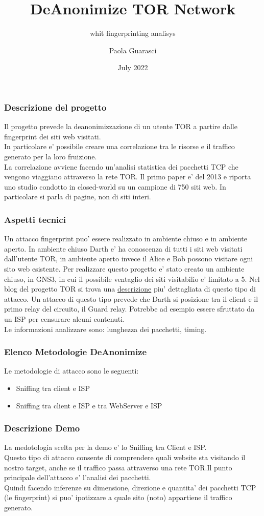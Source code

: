 \documentclass{beamer}[10pt]
\title[DeAnonTor]{DeAnonimize TOR Network}
\subtitle[]{whit fingerprinting analisys}
\author[Paola Guarasci]{Paola Guarasci}
\date[07/2022]{July 2022}
\begin{document}
\frame{\titlepage}

\begin{frame}
  \frametitle{Descrizione del progetto}
  Il progetto prevede la deanonimizzazione di un utente TOR a partire dalle fingerprint dei siti web visitati.
  \\In particolare e' possibile creare una correlazione tra le risorse e il traffico generato per la loro fruizione.
  \\La correlazione avviene facendo un'analisi statistica dei pacchetti TCP che vengono viaggiano attraverso la rete TOR.\@
  Il primo paper e' del 2013 e riporta uno studio condotto in closed-world su un campione di 750 siti web. In particolare si parla di pagine, non di siti interi.
\end{frame}

\begin{frame}
  \frametitle{Aspetti tecnici}
  Un attacco fingerprint puo' essere realizzato in ambiente chiuso e in ambiente aperto. In ambiente chiuso Darth e' ha conoscenza di tutti i siti web visitati dall'utente TOR, in ambiente aperto invece il Alice e Bob possono visitare ogni sito web esistente.
  Per realizzare questo progetto e' stato creato un ambiente chiuso, in GNS3, in cui il possibile ventaglio dei siti visitabilio e' limitato a 5.
  Nel blog del progetto TOR si trova una \href{https://blog.torproject.org/critique-website-traffic-fingerprinting-attacks/}{descrizione}  piu' dettagliata di questo tipo di attacco.
  Un attacco di questo tipo prevede che Darth si posizione tra il client e il primo relay del circuito, il Guard relay. Potrebbe ad esempio essere sfruttato da un ISP per censurare alcuni contenuti.
  \\ Le informazioni analizzare sono: lunghezza dei pacchetti, timing.
\end{frame}

\begin{frame}
  \frametitle{Elenco Metodologie DeAnonimize}
  Le metodologie di attacco sono le seguenti:
  \begin{itemize}
    \item Sniffing tra client e ISP
    \item Sniffing tra client e ISP e tra WebServer e ISP
  \end{itemize}
\end{frame}

\begin{frame}
  \frametitle{Descrizione Demo}
  La medotologia scelta per la demo e' lo Sniffing tra Client e ISP.\@
  \\ Questo tipo di attacco consente di comprendere quali website sta visitando il nostro target, anche se il traffico passa attraverso una rete TOR.\@ Il punto principale dell'attacco e' l'analisi dei pacchetti.\@
  \\ Quindi facendo inferenze su dimensione, direzione e quantita' dei pacchetti TCP (le fingerprint) si puo' ipotizzare a quale sito (noto) appartiene il traffico generato.
\end{frame}
\end{document}

